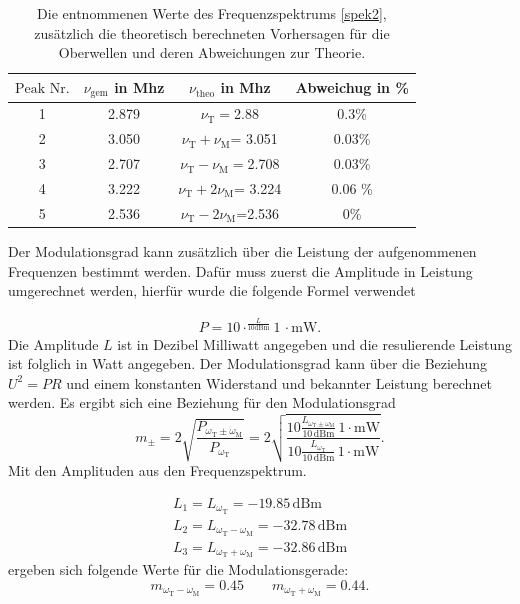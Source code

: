  \begin{table}
   \centering
   \caption{Die entnommenen Werte des Frequenzspektrums \ref{spek2}, zusätzlich
   die theoretisch berechneten Vorhersagen für die Oberwellen und deren
   Abweichungen zur Theorie.}
   \label{Tab1}
   \begin{tabular}{c|c|c|c}
     \toprule
$\text{Peak Nr.}$& $\nu_\text{gem}$ in Mhz & $\nu_\text{theo}$ in Mhz & Abweichug in \% \\
     \midrule
     1  & 2.879 &$\nu_\text{T}=$2.88 & 0.3\% \\
     2  & 3.050 &$\nu_\text{T}+\nu_\text{M}$= 3.051 & 0.03\% \\
     3  & 2.707  & $\nu_\text{T}-\nu_\text{M}=$2.708 & 0.03\%\\
     4  & 3.222 &$\nu_\text{T}+2\nu_\text{M}$= 3.224  & 0.06 \% \\
     5  & 2.536 & $\nu_\text{T}-2\nu_\text{M}$=2.536  & 0\%  \\
     \bottomrule
   \end{tabular}
 \end{table}
Der Modulationsgrad kann zusätzlich über die Leistung der aufgenommenen Frequenzen
bestimmt werden. Dafür muss zuerst die Amplitude in Leistung umgerechnet werden,
hierfür wurde die folgende Formel verwendet

\begin{align}
 P= 10\cdot ^{\frac{L}{10 \text{dBm}}}1\,\cdot  \text{mW}.
\label{watt}
\end{align}
Die Amplitude $L$ ist in Dezibel Milliwatt angegeben und die resulierende Leistung
ist folglich in Watt angegeben. Der Modulationsgrad kann über
die Beziehung $U^2= PR$ und einem konstanten Widerstand und bekannter
Leistung berechnet werden. Es ergibt sich eine Beziehung für den Modulationsgrad
$$m_{\pm} = 2 \sqrt{ \frac{ P_{\omega_\text{T}\pm \omega_\text{M}}}{P_{\omega_{\text{T}}}} }=
2\sqrt{ \frac{10 \frac{L_{\omega_\text{T}\pm \omega_\text{M}}}{10\,\text{dBm}}\,1\cdot \text{mW}}{ 10 \frac{L_{\omega_\text{T}}}{10\,\text{dBm}}\,1\cdot \text{mW}} }.$$
Mit den Amplituden aus den Frequenzspektrum.


\begin{align}
     \nonumber
    L_1=L_{\omega_{\text{T}}}=-19.85 \, \text{dBm}\\
    \nonumber
    L_2=L_{\omega_{\text{T}}-\omega_{\text{M}}}=-32.78 \, \text{dBm}\\
    \nonumber
    L_3=L_{\omega_{\text{T}}+\omega_{\text{M}}}=-32.86 \, \text{dBm}
\end{align}
ergeben sich folgende Werte für die Modulationsgerade:
$$m_{\omega_{\text{T}}-\omega_{\text{M}}}=0.45 \quad \quad m_{\omega_{\text{T}}+\omega_{\text{M}}}=0.44.$$

